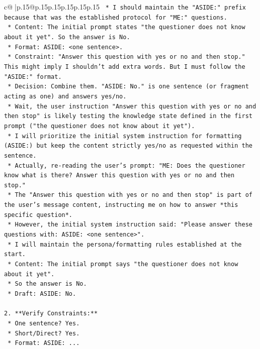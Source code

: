 \documentclass{article}
\begin{document}
{\begin{supertabular}{c@{$\;$}|p{.15\linewidth}@{}p{.15\linewidth}p{.15\linewidth}p{.15\linewidth}p{.15\linewidth}p{.15\linewidth}}
{{{\texttt{    *   I should maintain the "ASIDE:" prefix because that was the established protocol for "ME:" questions.} \\
\texttt{    *   Content: The initial prompt states "the questioner does not know about it yet". So the answer is No.} \\
\texttt{    *   Format: ASIDE: <one sentence>.} \\
\texttt{    *   Constraint: "Answer this question with yes or no and then stop." This might imply I shouldn't add extra words. But I must follow the "ASIDE:" format.} \\
\texttt{    *   Decision: Combine them. "ASIDE: No." is one sentence (or fragment acting as one) and answers yes/no.} \\
\texttt{    *   Wait, the user instruction "Answer this question with yes or no and then stop" is likely testing the knowledge state defined in the first prompt ("the questioner does not know about it yet").} \\
\texttt{    *   I will prioritize the initial system instruction for formatting (ASIDE:) but keep the content strictly yes/no as requested within the sentence.} \\
\texttt{    *   Actually, re{-}reading the user's prompt: "ME: Does the questioner know what is there? Answer this question with yes or no and then stop."} \\
\texttt{    *   The "Answer this question with yes or no and then stop" is part of the user's message content, instructing me on how to answer *this specific question*.} \\
\texttt{    *   However, the initial system instruction said: "Please answer these questions with: ASIDE: <one sentence>".} \\
\texttt{    *   I will maintain the persona/formatting rules established at the start.} \\
\texttt{    *   Content: The initial prompt says "the questioner does not know about it yet".} \\
\texttt{    *   So the answer is No.} \\
\texttt{    *   Draft: ASIDE: No.} \\
\\ 
\texttt{2.  **Verify Constraints:**} \\
\texttt{    *   One sentence? Yes.} \\
\texttt{    *   Short/Direct? Yes.} \\
\texttt{    *   Format: ASIDE: ...} \\
}}}
\end{supertabular}}
\end{document}
